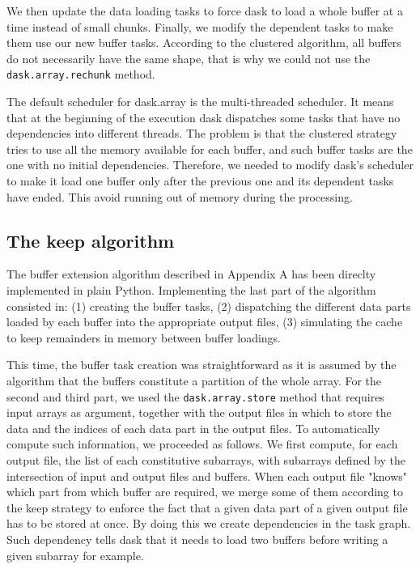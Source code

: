 \documentclass[conference]{IEEEtran}
\begin{document}
We then update the data loading tasks to force dask to load a whole buffer at
a time instead of small chunks. Finally, we modify the dependent tasks to make
them use our new buffer tasks. According to the clustered algorithm, all buffers
do not necessarily have the same shape, that is why we could not use the
\texttt{dask.array.rechunk} method.

The default scheduler for dask.array is the multi-threaded scheduler. It means
that at the beginning of the execution dask dispatches some tasks that have
no dependencies into different threads. The problem is that the clustered
strategy tries to use all the memory available for each buffer, and such buffer
tasks are the one with no initial dependencies. Therefore, we needed to
modify dask's scheduler to make it load one buffer only after the previous one
and its dependent tasks have ended. This avoid running out of memory during the
processing.

\subsection{The keep algorithm}

The buffer extension algorithm described in Appendix A has been direclty
implemented in plain Python. Implementing the last part of the algorithm
consisted in: (1) creating the buffer tasks, (2) dispatching the different data
parts loaded by each buffer into the appropriate output files, (3) simulating
the cache to keep remainders in memory between buffer loadings.

This time, the buffer task creation was straightforward as it is assumed by the
algorithm that the buffers constitute a partition of the whole array. For the
second and third part, we used the \texttt{dask.array.store} method that
requires input arrays as argument, together with the output files in which to
store the data and the indices of each data part in the output files. To
automatically compute such information, we proceeded as follows. We first
compute, for each output file, the list of each constitutive subarrays, with
subarrays defined by the intersection of input and output files and buffers.
When each output file "knows" which part from which buffer are required, we
merge some of them according to the keep strategy to enforce the fact that
a given data part of a given output file has to be stored at once. By doing this
we create dependencies in the task graph. Such dependency tells dask that it
needs to load two buffers before writing a given subarray for example.
\end{document}
